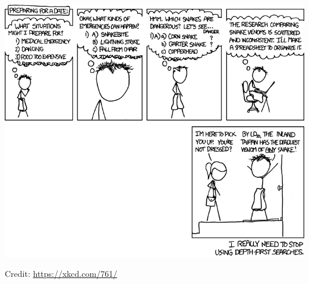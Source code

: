 \documentclass[a4paper]{article}
\begin{document}

\begin{onlysolution}
  \begin{center}
    \includegraphics[scale=0.5]{xkcd_761}

    \scriptsize Credit: \href{https://xkcd.com/761/}{https://xkcd.com/761/}
  \end{center}
\end{onlysolution}





\end{document}
